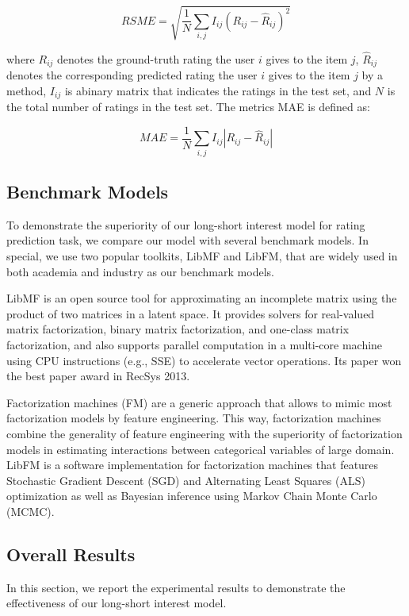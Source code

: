 \documentclass{sig-alternate-05-2015}
\begin{document}
\begin{equation}
    RSME = \sqrt{ \frac{1}{N} \sum_{i,j} I_{ij} (R_{ij} - \hat{R}_{ij})^2 }
\end{equation}

where $R_{ij}$ denotes the ground-truth rating the user $i$ gives to the item $j$,
$\hat{R}_{ij}$ denotes the corresponding predicted rating the user $i$ gives to
the item $j$ by a method, $I_{ij}$ is abinary matrix that indicates the ratings
in the test set, and $N$ is the total number of ratings in the test set.
The metrics MAE is defined as:

\begin{equation}
    MAE = \frac{1}{N} \sum_{i,j} I_{ij} |R_{ij} - \hat{R}_{ij}|
\end{equation}

\subsection{Benchmark Models}
To demonstrate the superiority of our long-short interest model for rating prediction task,
we compare our model with several benchmark models.
In special, we use two popular toolkits, LibMF and LibFM, that are
widely used in both academia and industry as our benchmark models.

LibMF is an open source tool for approximating an incomplete matrix
using the product of two matrices in a latent space.
It provides solvers for real-valued matrix factorization,
binary matrix factorization, and one-class matrix factorization, and 
also supports parallel computation in a multi-core machine using CPU
instructions (e.g., SSE) to accelerate vector operations.
Its paper \cite{chin2015fast} won the best paper award in RecSys 2013.

Factorization machines (FM) are a generic approach that
allows to mimic most factorization models by feature engineering.
This way, factorization machines combine the generality of
feature engineering with the superiority of factorization models
in estimating interactions between categorical variables of large domain.
LibFM \cite{rendle2012factorization} is a software implementation
for factorization machines that features
Stochastic Gradient Descent (SGD) and
Alternating Least Squares (ALS) optimization as well as
Bayesian inference using Markov Chain Monte Carlo (MCMC).

\subsection{Overall Results}
In this section, we report the experimental results to demonstrate
the effectiveness of our long-short interest model.
\end{document}
